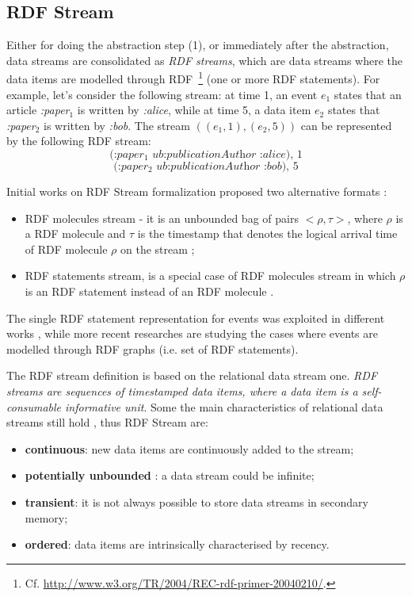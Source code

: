 \subsection{RDF Stream}\label{sec:rdfstream}

Either for doing the abstraction step (1), or immediately after the abstraction, data streams are consolidated as \textit{RDF streams}, which are data streams where the data items are modelled through RDF~\footnote{Cf. \url{http://www.w3.org/TR/2004/REC-rdf-primer-20040210/}.} (one or more RDF statements). For example, let's consider the following stream: at time 1, an event $e_1$ states that an article \textit{:paper$_1$} is written by \textit{:alice}, while at time 5, a data item $e_2$ states that \textit{:paper$_2$} is written by \textit{:bob}. The stream $((e_1,1),(e_2,5))$ can be represented by the following RDF stream:
\[\textit{(:paper$_1$ ub:publicationAuthor :alice), 1}\]
\[\textit{(:paper$_2$ ub:publicationAuthor :bob), 5}\]

Initial works on RDF Stream formalization proposed two alternative formats \cite{DBLP:conf/fis/ValleCBBC08}:
\begin{itemize}
\item RDF molecules stream - it is an unbounded bag of pairs $< \rho, \tau >$, where $\rho$ is a RDF molecule \cite{TrackingMolecules} and $\tau$ is the timestamp that denotes the logical arrival time of RDF molecule $\rho$ on the stream \cite{DBLP:conf/fis/ValleCBBC08};
\item RDF statements stream, is a special case of RDF molecules stream in which $\rho$ is an RDF statement instead of an RDF molecule  .
\end{itemize} 

The single RDF statement representation for events was exploited in different works  \cite{Barbieri2010,Lephuoc2011}, while more recent researches \cite{DBLP:conf/semweb/BalduiniVDTPC13} are studying the cases where events are modelled through RDF graphs (i.e. set of RDF statements). 

The  RDF stream  definition is based on the relational data stream one. \textit{RDF streams are sequences of timestamped data items, where a data item is a self- consumable informative unit}. Some the main characteristics of relational data streams still hold \cite{DBLP:conf/pods/BabcockBDMW02}, thus RDF Stream are:
\begin{itemize}
\item \textbf{continuous}: new data items are continuously added to the stream;
\item \textbf{potentially unbounded} : a data stream could be infinite;
\item \textbf{transient}: it is not always possible to store data streams in secondary memory;
\item \textbf{ordered}: data items are intrinsically characterised by recency.
\end{itemize}

